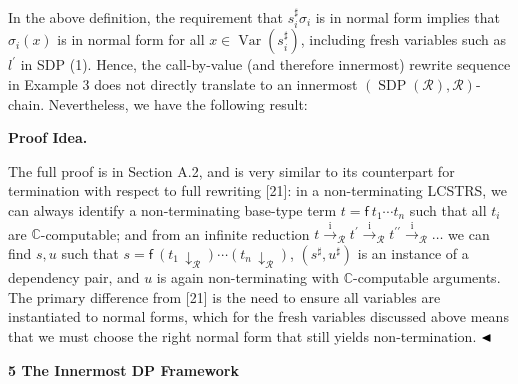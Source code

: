 \documentclass[10pt,a4paper]{amsart}
\begin{document}
 
 
 
In the above definition, the requirement that $s_{i}^{\sharp}\sigma_{i}$ is in normal form implies that $\sigma_{i}(x)$ is in normal form for all $x\in\operatorname{Var}(s_{i}^{\sharp})$, including fresh variables such as $l^{\prime}$ in SDP (1). Hence, the call-by-value (and therefore innermost) rewrite sequence in Example 3 does not directly translate to an innermost $(\operatorname{SDP}(\mathcal{R}),\mathcal{R})$-chain. Nevertheless, we have the following result:\par
 

 
\par\medskip\noindent\textbf{Proof Idea.}\par
 
 
The full proof is in Section A.2, and is very similar to its counterpart for termination with respect to full rewriting [21]: in a non-terminating LCSTRS, we can always identify a non-terminating base-type term $t={\mathsf{f}}\ {{t}_{1}\cdots{t}_{n}}$ such that all $t_{i}$ are $\mathbb{C}$-computable; and from an infinite reduction $t\xrightarrow{\scriptscriptstyle\mathrm{i}}_{\mathcal{R}}t^{\prime}\xrightarrow{\scriptscriptstyle\mathrm{i}}_{\mathcal{R}}t^{\prime\prime}\xrightarrow{\scriptscriptstyle\mathrm{i}}_{\mathcal{R}}\dots$ we can find $s,u$ such that $s={\mathsf{f}}\ {(t_{1}\,{\downarrow}_{\mathcal{R}})\cdots(t_{n}\,{\downarrow}_{\mathcal{R}})}$, $(s^{\sharp},u^{\sharp})$ is an instance of a dependency pair, and $u$ is again non-terminating with $\mathbb{C}$-computable arguments. The primary difference from [21] is the need to ensure all variables are instantiated to normal forms, which for the fresh variables discussed above means that we must choose the right normal form that still yields non-termination. $\hfill\blacktriangleleft$\par
 
 
 


 
\par\medskip\noindent\textbf{5 The Innermost DP Framework}\par
 
\end{document}
